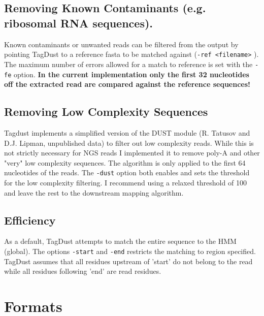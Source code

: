 \documentclass[11pt,a4paper,oneside]{book}
\begin{document}
\subsection{Removing Known Contaminants (e.g. ribosomal RNA sequences).}
Known contaminants or unwanted reads can be filtered from the output by pointing TagDust to a reference fasta to be matched against ({\tt -ref <filename>} ). The maximum number of errors allowed for a match to reference is set with the {\tt -fe} option. {\bf In the current implementation only the first 32 nucleotides off the extracted read are compared against the reference sequences!}
\subsection{Removing Low Complexity Sequences}
Tagdust implements a simplified version of the DUST module (R. Tatusov and D.J. Lipman, unpublished data) to filter out low complexity reads. While this is not strictly necessary for NGS reads I implemented it to remove poly-A and other "very" low complexity sequences. The algorithm is only applied to the first 64 nucleotides of the reads. The {\tt -dust} option both enables and sets the threshold for the low complexity filtering. I recommend using a relaxed threshold of 100 and leave the rest to the downstream mapping algorithm. 


\subsection{Efficiency}
As a default, TagDust attempts to match the entire sequence to the HMM (global). The options {\tt -start} and {\tt -end} restricts the matching to region specified. TagDust assumes that all residues upstream of 'start' do not belong to the read while all residues following 'end' are read residues.






\section{Formats}
\end{document}
